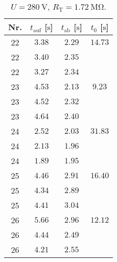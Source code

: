 \begin{table}[H]
 \begin{center}
 \caption{$U=\SI{280}{\volt}$, $R_{\mathup{T}}=\SI{1.72}{\mega\ohm}$.}
 \label{tab:280V}
   \begin{tabular}{cccc}
     \toprule
     {Nr.} & {$t_{\mathup{auf}}$ [$\si{\second}$]} & {$t_{\mathup{ab}}$ [$\si{\second}$]} & {$t_0$ [$\si{\second}$]}\\
     \midrule
     22 & $ 3.38$ & $2.29$ & $14.73$ \\
     22 & $ 3.40$ & $2.35$ &         \\
     22 & $ 3.27$ & $2.34$ &         \\
     23 & $ 4.53$ & $2.13$ & $ 9.23$ \\
     23 & $ 4.52$ & $2.32$ &         \\
     23 & $ 4.64$ & $2.40$ &         \\
     24 & $ 2.52$ & $2.03$ & $31.83$ \\
     24 & $ 2.13$ & $1.96$ &         \\
     24 & $ 1.89$ & $1.95$ &         \\
     25 & $ 4.46$ & $2.91$ & $16.40$ \\
     25 & $ 4.34$ & $2.89$ &         \\
     25 & $ 4.41$ & $3.04$ &         \\
     26 & $ 5.66$ & $2.96$ & $12.12$ \\
     26 & $ 4.44$ & $2.49$ &         \\
     26 & $ 4.21$ & $2.55$ &         \\
     \bottomrule
   \end{tabular}
 \end{center}
\end{table}
